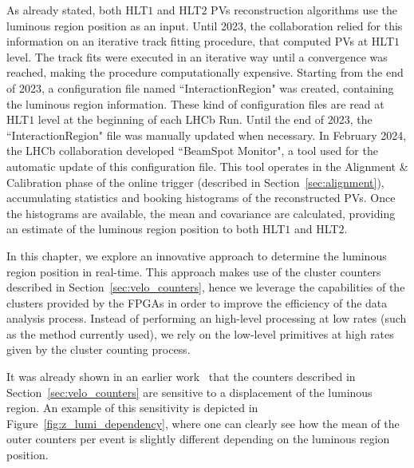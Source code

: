 As already stated, both HLT$1$ and HLT$2$ PVs reconstruction algorithms use the luminous region position as an input. Until 2023, the collaboration relied for this information on an iterative track fitting procedure, that computed PVs at HLT$1$ level. The track fits were executed in an iterative way until a convergence was reached, making the procedure computationally expensive. Starting from the end of 2023, a configuration file named ``InteractionRegion" was created, containing the luminous region information. These kind of configuration files are read at HLT$1$ level at the beginning of each LHCb Run.  Until the end of 2023, the ``InteractionRegion" file was manually updated when necessary. In February 2024, the LHCb collaboration developed ``BeamSpot Monitor", a tool used for the automatic update of this configuration file.  This tool operates in the Alignment \& Calibration phase of the online trigger (described in Section~\ref{sec:alignment}), accumulating statistics and booking histograms of the reconstructed PVs. Once the histograms are available, the mean and covariance are calculated, providing an estimate of the luminous region position to both HLT$1$ and HLT$2$. 

In this chapter, we explore an innovative approach to determine the luminous region position in real-time.
This approach makes use of the cluster counters described in Section~\ref{sec:velo_counters}, hence we leverage the capabilities of the clusters provided by the FPGAs in order to improve the efficiency of the data analysis process. Instead of performing an high-level processing at low rates (such as the method currently used), we rely on the low-level primitives at high rates given by the cluster counting process.

It was already shown in an earlier work~\cite{dan} that the counters described in Section~\ref{sec:velo_counters} are sensitive to a displacement of the luminous region. An example of this sensitivity is depicted in Figure~\ref{fig:z_lumi_dependency}, where one can clearly see how the mean of the outer counters per event is slightly different depending on the luminous region position. 

